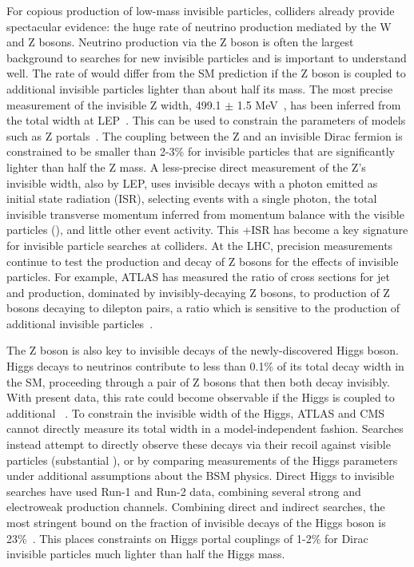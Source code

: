For copious production of low-mass invisible particles, colliders already provide spectacular evidence: the huge rate of neutrino production mediated by the W and Z bosons. 
Neutrino production via the Z boson is often the largest background to searches for new invisible particles and is important to understand well.
The rate of would differ from the SM prediction if the Z boson is coupled to additional invisible particles lighter than about half its mass.
The most precise measurement of the invisible Z width, 499.1 $\pm$ 1.5 MeV~\cite{Patrignani:2016xqp}, has been inferred from the total width at LEP~\cite{ALEPH:2005ab}.
This can be used to constrain the parameters of models such as Z portals~\cite{Carena:2003aj,Arcadi:2014lta,Escudero:2016gzx}.
The coupling between the Z and an invisible Dirac fermion is constrained to be smaller than 2-3\% for invisible particles that are significantly lighter than half the Z mass.
A less-precise direct measurement of the Z's invisible width, also by LEP, uses invisible decays with a photon emitted as initial state radiation (ISR), selecting events with a single photon, the total invisible transverse momentum inferred from momentum balance with the visible particles (\MET), and little other event activity.
This \MET+ISR has become a key signature for invisible particle searches at colliders. 
At the LHC, precision measurements continue to test the production and decay of Z bosons for the effects of invisible particles. 
For example, ATLAS has measured the ratio of cross sections for jet and \MET production, dominated by invisibly-decaying Z bosons, to production of Z bosons decaying to dilepton pairs, a ratio which is sensitive to the production of additional invisible particles~\cite{Aaboud:2017buf}. 

The Z boson is also key to invisible decays of the newly-discovered Higgs boson.
Higgs decays to neutrinos contribute to less than 0.1\% of its total decay width in the SM, proceeding through a pair of Z bosons that then both decay invisibly.
With present data, this rate could become observable if the Higgs is coupled to additional \IP~\cite{Khachatryan:2016vau,Englert:2011yb,Aad:2015pla}.
To constrain the invisible width of the Higgs, ATLAS and CMS cannot directly measure its total width in a model-independent fashion\cite{Dobrescu:2012td}.
Searches instead attempt to directly observe these decays via their recoil against visible particles (substantial \MET), or by comparing measurements of the Higgs parameters under additional assumptions about the BSM physics.
Direct Higgs to invisible searches have used Run-1 and Run-2 data, combining several strong and electroweak production channels.
Combining direct and indirect searches, the most stringent bound on the fraction of invisible decays of the Higgs boson is 23\%~\cite{Khachatryan:2016whc,Aad:2015pla}.
This places constraints on Higgs portal couplings of 1-2\% for Dirac invisible particles much lighter than half the Higgs mass. 

